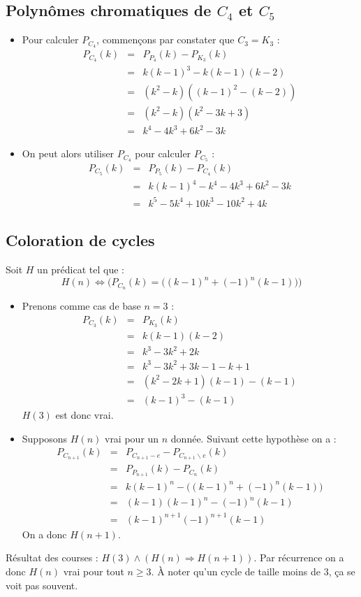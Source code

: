\subsection{Polynômes chromatiques de $C_4$ et $C_5$}
\begin {itemize}
\item Pour calculer $P_{C_4}$, commençons par constater que $C_3 = K_3$ :
\begin{eqnarray*}
P_{C_4}(k)	& = &	P_{P_4}(k) - P_{K_3}(k)				\\
			& = & 	k(k-1)^3 - k(k-1)(k-2)				\\
			& = & 	(k^2 - k)((k-1)^2 - (k-2))			\\
			& = &	(k^2 - k)(k^2 - 3k + 3)				\\
			& = & 	k^4 - 4k^3 + 6k^2 - 3k							
\end{eqnarray*}
\item On peut alors utiliser $P_{C_4}$ pour calculer $P_{C_5}$ :
\begin{eqnarray*}
P_{C_5}(k)	& = &	P_{P_5}(k) - P_{C_4}(k)				\\
			& = & 	k(k-1)^4 - k^4 -4k^3 + 6k^2 - 3k	\\
			& = &	k^5 - 5k^4 + 10k^3 - 10k^2 + 4k		 
\end{eqnarray*}
\end {itemize}

\subsection{Coloration de cycles}
Soit $H$ un prédicat tel que : 
\[ H(n) \Leftrightarrow \Big(P_{C_n}(k) = \big((k-1)^n + (-1)^n(k-1)\big)\Big) \]
\begin{itemize}
\item Prenons comme cas de base $n = 3$ :
\begin{eqnarray*}
P_{C_3}(k) 				& = &	P_{K_3}(k)						\\ 
						& = &	k(k-1)(k-2)						\\
						& = &	k^3 - 3k^2 + 2k					\\
						& = &   k^3 - 3k^2 + 3k - 1 - k + 1 	\\
						& = &	(k^2 -2k + 1)(k-1) - (k-1)		\\
						& = &	(k-1)^3 -(k-1) 					
\end{eqnarray*} $H(3)$ est donc vrai.
\item Supposons $H(n)$ vrai pour un $n$ donnée. Suivant cette hypothèse on a :
\begin{eqnarray*}
P_{C_{n+1}}(k)			& = & P_{C_{n+1}-e} - P_{C_{n+1}\backslash{e}}(k)	\\
						& = & P_{P_{n+1}}(k) - P_{C_n}(k)					\\
						& = & k(k-1)^n - \Big((k-1)^n + (-1)^n(k-1)\Big)	\\
						& = & (k-1)(k-1)^n - (-1)^n(k-1)					\\
						& = & (k-1)^{n+1} (-1)^{n+1}(k-1)					
\end{eqnarray*}
On a donc $H(n+1)$.
\end{itemize}
Résultat des courses : $H(3) \wedge (H(n) \Rightarrow H(n+1))$. Par récurrence on a donc $H(n)$ vrai pour tout $n \geq 3$. À noter qu'un cycle de taille moins de $3$, ça se voit pas souvent.

